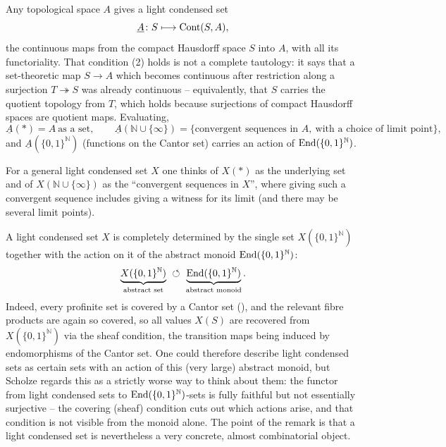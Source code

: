 \begin{example}
\label{ex:2:top-to-condensed}
Any topological space $A$ gives a light condensed set
\begin{equation*}
\underline{A}\colon S\longmapsto \operatorname{Cont}(S,A),
\end{equation*}
the continuous maps from the compact Hausdorff space $S$ into $A$, with all its
functoriality. That condition (2) holds is not a complete tautology: it says that
a set-theoretic map $S\to A$ which becomes continuous after restriction along a
surjection $T\twoheadrightarrow S$ was already continuous -- equivalently, that
$S$ carries the quotient topology from $T$, which holds because surjections of
compact Hausdorff spaces are quotient maps. Evaluating,
\[
\underline{A}(\ast)=A\ \text{as a set},\qquad
\underline{A}(\mathbb{N}\cup\{\infty\})=\{\text{convergent sequences in }A,\
\text{with a choice of limit point}\},
\]
and $\underline{A}(\{0,1\}^{\mathbb{N}})$ (functions on the Cantor set) carries an
action of $\operatorname{End}(\{0,1\}^{\mathbb{N}})$.
\end{example}

For a general light condensed set $X$ one thinks of $X(\ast)$ as the underlying
set and of $X(\mathbb{N}\cup\{\infty\})$ as the ``convergent sequences in $X$'',
where giving such a convergent sequence includes giving a witness for its limit
(and there may be several limit points).

\begin{remark}
\label{rmk:2:monoid-action}
A light condensed set $X$ is completely determined by the single set
$X(\{0,1\}^{\mathbb{N}})$ together with the action on it of the abstract monoid
$\operatorname{End}(\{0,1\}^{\mathbb{N}})$:
\[
\underbrace{X(\{0,1\}^{\mathbb{N}})}_{\text{abstract set}}\ \circlearrowleft\
\underbrace{\operatorname{End}(\{0,1\}^{\mathbb{N}})}_{\text{abstract monoid}}.
\]
Indeed, every profinite set is covered by a Cantor set
(), and the relevant fibre products are again so
covered, so all values $X(S)$ are recovered from $X(\{0,1\}^{\mathbb{N}})$ via the
sheaf condition, the transition maps being induced by endomorphisms of the Cantor
set. One could therefore describe light condensed sets as certain sets with an
action of this (very large) abstract monoid, but Scholze regards this as a
strictly worse way to think about them: the functor from light condensed sets to
$\operatorname{End}(\{0,1\}^{\mathbb{N}})$-sets is fully faithful but not essentially
surjective -- the covering (sheaf) condition cuts out which actions arise, and
that condition is not visible from the monoid alone. The point of the remark is
that a light condensed set is nevertheless a very concrete, almost combinatorial
object.
\end{remark}

